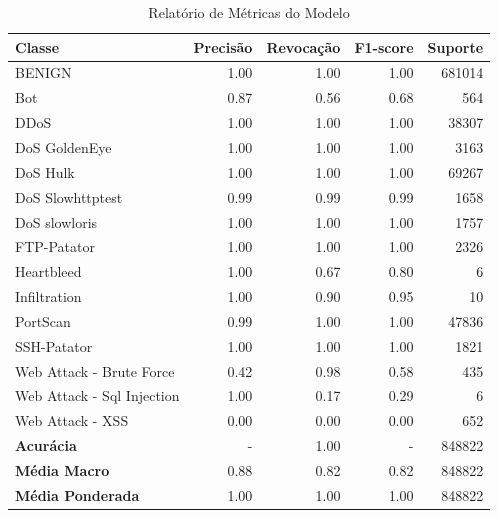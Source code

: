 \begin{table}[H]
    \centering
    \small
    \begin{tabular}{lrrrr}
        \hline
        Classe                     & Precisão & Revocação & F1-score & Suporte \\
        \hline
        BENIGN                     & 1.00     & 1.00      & 1.00     & 681014  \\
        Bot                        & 0.87     & 0.56      & 0.68     & 564     \\
        DDoS                       & 1.00     & 1.00      & 1.00     & 38307   \\
        DoS GoldenEye              & 1.00     & 1.00      & 1.00     & 3163    \\
        DoS Hulk                   & 1.00     & 1.00      & 1.00     & 69267   \\
        DoS Slowhttptest           & 0.99     & 0.99      & 0.99     & 1658    \\
        DoS slowloris              & 1.00     & 1.00      & 1.00     & 1757    \\
        FTP-Patator                & 1.00     & 1.00      & 1.00     & 2326    \\
        Heartbleed                 & 1.00     & 0.67      & 0.80     & 6       \\
        Infiltration               & 1.00     & 0.90      & 0.95     & 10      \\
        PortScan                   & 0.99     & 1.00      & 1.00     & 47836   \\
        SSH-Patator                & 1.00     & 1.00      & 1.00     & 1821    \\
        Web Attack - Brute Force   & 0.42     & 0.98      & 0.58     & 435     \\
        Web Attack - Sql Injection & 1.00     & 0.17      & 0.29     & 6       \\
        Web Attack - XSS           & 0.00     & 0.00      & 0.00     & 652     \\
        \hline
        \textbf{Acurácia}          & -        & 1.00      & -        & 848822  \\
        \textbf{Média Macro}       & 0.88     & 0.82      & 0.82     & 848822  \\
        \textbf{Média Ponderada}   & 1.00     & 1.00      & 1.00     & 848822  \\
        \hline
    \end{tabular}
    \caption{Relatório de Métricas do Modelo}
    \label{table:rf_Sem_XSS_metricas}
\end{table}